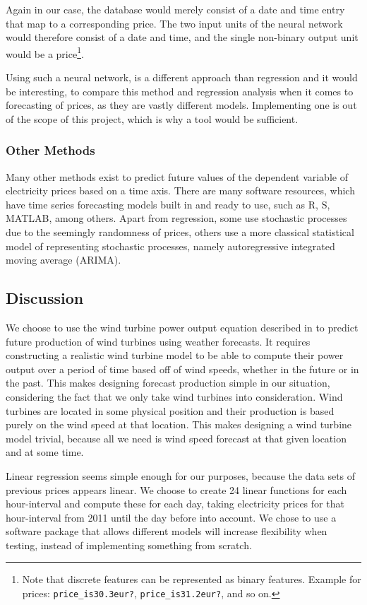 Again in our case, the database would merely consist of a date and time entry that map to a corresponding price. The two input units of the neural network would therefore consist of a date and time, and the single non-binary output unit would be a price\footnote{Note that discrete features can be represented as binary features. Example for prices: \texttt{price\_is30.3eur?}, \texttt{price\_is31.2eur?}, and so on.}.

Using such a neural network, is a different approach than regression and it would be interesting, to compare this method and regression analysis when it comes to forecasting of prices, as they are vastly different models. Implementing one is out of the scope of this project, which is why a tool would be sufficient.

\subsubsection{Other Methods}
Many other methods exist to predict future values of the dependent variable of electricity prices based on a time axis. There are many software resources, which have time series forecasting models built in and ready to use, such as R, S, MATLAB, among others. Apart from regression, some use stochastic processes due to the seemingly randomness of prices, others use a more classical statistical model of representing stochastic processes, namely autoregressive integrated moving average (ARIMA).

\subsection{Discussion}
We choose to use the wind turbine power output equation described in  to predict future production of wind turbines using weather forecasts. It requires constructing a realistic wind turbine model to be able to compute their power output over a period of time based off of wind speeds, whether in the future or in the past. This makes designing forecast production simple in our situation, considering the fact that we only take wind turbines into consideration. Wind turbines are located in some physical position and their production is based purely on the wind speed at that location. This makes designing a wind turbine model trivial, because all we need is wind speed forecast at that given location and at some time.

Linear regression seems simple enough for our purposes, because the data sets of previous prices appears linear. We choose to create 24 linear functions for each hour-interval and compute these for each day, taking electricity prices for that hour-interval from 2011 until the day before into account. We chose to use a software package that allows different models will increase flexibility when testing, instead of implementing something from scratch. 

